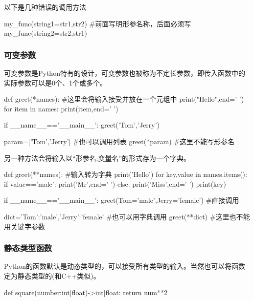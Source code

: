 \documentclass{article}
\begin{document}
        以下是几种错误的调用方法
        \begin{codeblock}[language=python, caption={mistakes in using functions}]
          my_func(string1=str1,str2) #前面写明形参名称，后面必须写
          my_func(string2=str2,str1)
        \end{codeblock}

      \subsubsection{可变参数}
        可变参数是Python特有的设计，可变参数也被称为不定长参数，即传入函数中的实际参数可以是0个、1个或多个。
        \begin{codeblock}[language=python, caption={variable parameters}]
          def greet(*names): #这里会将输入接受并放在一个元组中
            print("Hello",end=' ')
            for item in names:
              print(item,end=' ')

          if __name__=='__main__':
            greet('Tom','Jerry')

            param=['Tom','Jerry'] #也可以调用列表
            greet(*param) #这里不能写形参名
        \end{codeblock}

        另一种方法会将输入以``形参名:变量名''的形式存为一个字典。
        \begin{codeblock}[language=python, caption={other variable parameters}]
          def greet(**names): #输入转为字典
            print('Hello')
            for key,value in names.items():
              if value=='male':
                print('Mr',end=' ')
              else:
                print('Miss',end=' ')
              print(key)

          if __name__=='__main__':
            greet(Tom='male',Jerry='female') #直接调用

            dict={'Tom':'male','Jerry':'female'} #也可以用字典调用
            greet(**dict) #这里也不能用关键字参数
        \end{codeblock}

      \subsubsection{静态类型函数}
        Python的函数默认是动态类型的，可以接受所有类型的输入。当然也可以将函数定为静态类型的(和C++类似)。
        \begin{codeblock}[language=python, caption={static functions}]
          def square(number:int|float)->int|float:
            return num**2
        \end{codeblock}
\end{document}
